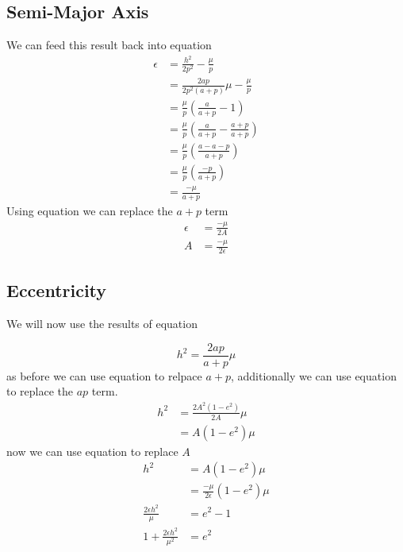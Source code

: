 \subsection{Semi-Major Axis}
We can feed this result back into equation 
\begin{align}
\epsilon &= \frac{h^2}{2p^2}-\frac{\mu}{p} \nonumber \\
&= \frac{2ap}{2p^2(a+p)}\mu-\frac{\mu}{p} \nonumber \\
&= \frac{\mu}{p}\left(\frac{a}{a+p}-1 \right) \nonumber \\
&= \frac{\mu}{p}\left(\frac{a}{a+p}-\frac{a+p}{a+p} \right) \nonumber \\
&= \frac{\mu}{p}\left(\frac{a-a-p}{a+p}\right) \nonumber \\
&= \frac{\mu}{p}\left(\frac{-p}{a+p}\right) \nonumber \\
&= \frac{-\mu}{a+p}
\end{align}
Using equation  we can replace the $a+p$ term
\begin{align}
\epsilon &= \frac{-\mu}{2A} \nonumber \\
A &= \frac{-\mu}{2\epsilon}\label{eq:phys-geom5}
\end{align}

\subsection{Eccentricity}

We will now use the results of equation 

\begin{equation*}
h^2= \frac{2ap}{a+p}\mu
\end{equation*}
as before we can use equation  to relpace $a+p$, additionally
we can use equation  to replace the $ap$ term.
\begin{align}
h^2 &= \frac{2A^2(1-e^2)}{2A}\mu \nonumber \\
&= A(1-e^2)\mu
\end{align}
now we can use equation  to replace $A$
\begin{align}
h^2 &= A(1-e^2)\mu \nonumber \\
&=\frac{-\mu}{2\epsilon}(1-e^2)\mu \nonumber \\
\frac{2\epsilon h^2}{\mu}&=e^2-1 \nonumber \\
1+\frac{2\epsilon h^2}{\mu^2}&=e^2 \label{eq:phys-geom8}
\end{align}

